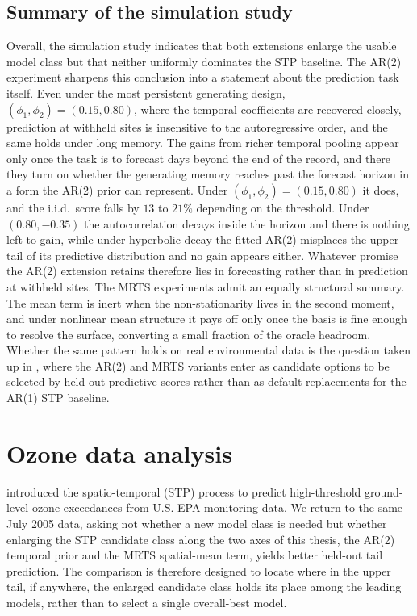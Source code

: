\documentclass[12pt]{article}
\begin{document}
\subsection{Summary of the simulation study}\label{sec:sim-summary}

Overall, the simulation study indicates that both extensions enlarge the usable model class but that neither uniformly dominates the STP baseline.  The AR(2) experiment sharpens this conclusion into a statement about the prediction task itself.  Even under the most persistent generating design, $(\phi_1, \phi_2) = (0.15, 0.80)$, where the temporal coefficients are recovered closely, prediction at withheld sites is insensitive to the autoregressive order, and the same holds under long memory.  The gains from richer temporal pooling appear only once the task is to forecast days beyond the end of the record, and there they turn on whether the generating memory reaches past the forecast horizon in a form the AR(2) prior can represent.  Under $(\phi_1, \phi_2) = (0.15, 0.80)$ it does, and the i.i.d.\ score falls by $13$ to $21\%$ depending on the threshold.  Under $(0.80, -0.35)$ the autocorrelation decays inside the horizon and there is nothing left to gain, while under hyperbolic decay the fitted AR(2) misplaces the upper tail of its predictive distribution and no gain appears either.  Whatever promise the AR(2) extension retains therefore lies in forecasting rather than in prediction at withheld sites.  The MRTS experiments admit an equally structural summary.  The mean term is inert when the non-stationarity lives in the second moment, and under nonlinear mean structure it pays off only once the basis is fine enough to resolve the surface, converting a small fraction of the oracle headroom.  Whether the same pattern holds on real environmental data is the question taken up in , where the AR(2) and MRTS variants enter as candidate options to be selected by held-out predictive scores rather than as default replacements for the AR(1) STP baseline.

\section{Ozone data analysis}\label{sec:ozonedata}

\textcite{morris_space-time_2017} introduced the spatio-temporal \skewt (STP) process to predict high-threshold ground-level ozone exceedances from U.S. EPA monitoring data.  We return to the same July 2005 data, asking not whether a new model class is needed but whether enlarging the STP candidate class along the two axes of this thesis, the AR(2) temporal prior and the MRTS spatial-mean term, yields better held-out tail prediction.  The comparison is therefore designed to locate where in the upper tail, if anywhere, the enlarged candidate class holds its place among the leading models, rather than to select a single overall-best model.
\end{document}
